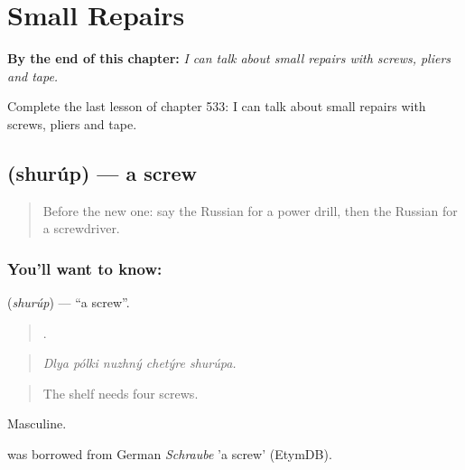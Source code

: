 
\chapter{Small Repairs}
\label{ch:ru-small-repairs}

\begin{chapteropening}
\textbf{By the end of this chapter:} \emph{I can talk about small repairs with screws, pliers and tape.}

Complete the last lesson of chapter 533: I can talk about small repairs with screws, pliers and tape.
\end{chapteropening}

\section[\texorpdfstring{\ru{шуруп} (shurúp)}{шуруп (shurúp)}]{ (shurúp) — a screw}

\label{lesson:RU-C533-shurup}



\begin{quote}
Before the new one: say the Russian for a power drill, then the Russian for a screwdriver.
\end{quote}

\subsection*{You'll want to know: }
\textbf{} (\emph{shurúp}) — \textquotedblleft{}a screw\textquotedblright{}.

\begin{quote}
    .
\end{quote}

\begin{quote}
\emph{Dlya pólki nuzhný chetýre shurúpa.}
\end{quote}

\begin{quote}
The shelf needs four screws.
\end{quote}

Masculine.

\begin{cousinweb}
\emph{} was borrowed from German \emph{Schraube} 'a screw' (EtymDB).
\end{cousinweb}

